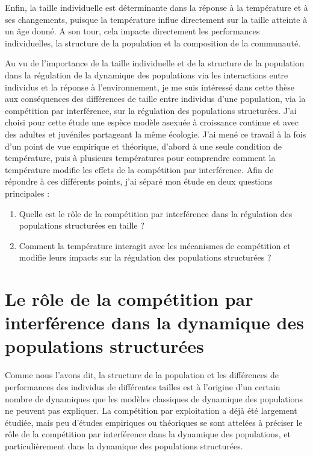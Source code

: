 Enfin, la taille individuelle est déterminante dans la réponse à la température
et à ses changements, puisque la température influe directement sur la taille
atteinte à un âge donné. A son tour, cela impacte directement les performances
individuelles, la structure de la population et la composition de la communauté. 

Au vu de l'importance de la taille individuelle et de la structure de la
population dans la régulation de la dynamique des populations via les
interactions entre individus et la réponse à l'environnement, je me suis
intéressé dans cette thèse aux conséquences des différences de taille entre
individus d'une population, via la compétition par interférence, sur la
régulation des populations structurées.  J'ai choisi pour cette étude une espèce
modèle asexuée à croissance continue et avec des adultes et juvéniles partageant
la même écologie. J'ai mené ce travail à la fois d'un point de vue empirique et
théorique, d'abord à une seule condition de température, puis à plusieurs
températures pour comprendre comment la température modifie les effets de la
compétition par interférence. Afin de répondre à ces différents points, j'ai
séparé mon étude en deux questions principales :
\begin{enumerate}
  \item Quelle est le rôle de la compétition par interférence dans la régulation
  des populations structurées en taille ?
  \item Comment la température interagit avec les mécanismes de compétition et
  modifie leurs impacts sur la régulation des populations structurées ?
\end{enumerate}

\section{Le rôle de la compétition par interférence dans la dynamique des
populations structurées}

Comme nous l'avons dit, la structure de la population et les différences de
performances des individus de différentes tailles est à l'origine d'un certain
nombre de dynamiques que les modèles classiques de dynamique des populations ne
peuvent pas expliquer. La compétition par exploitation a déjà été largement
étudiée, mais peu d'études empiriques ou théoriques se sont attelées à préciser
le rôle de la compétition par interférence dans la dynamique des populations, et
particulièrement dans la dynamique des populations structurées.

